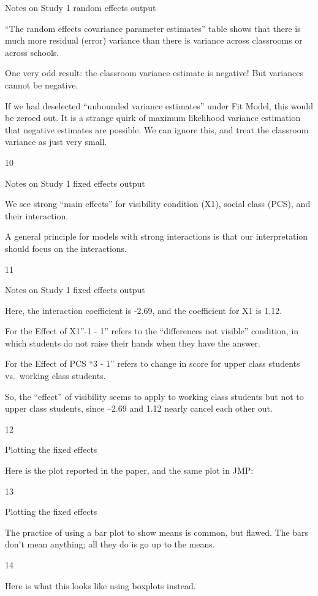 \documentclass[
  letterpaper,
  DIV=11,
  numbers=noendperiod]{scrreprt}
\begin{document}
Notes on Study 1 random effects output

``The random effects covariance parameter estimates'' table shows that
there is much more residual (error) variance than there is variance
across classrooms or across schools.

One very odd result: the classroom variance estimate is negative! But
variances cannot be negative.

If we had deselected ``unbounded variance estimates'' under Fit Model,
this would be zeroed out. It is a strange quirk of maximum likelihood
variance estimation that negative estimates are possible. We can ignore
this, and treat the classroom variance as just very small.

10

Notes on Study 1 fixed effects output

We see strong ``main effects'' for visibility condition (X1), social
class (PCS), and their interaction.

A general principle for models with strong interactions is that our
interpretation should focus on the interactions.

11

Notes on Study 1 fixed effects output

Here, the interaction coefficient is -2.69, and the coefficient for X1
is 1.12.

For the Effect of X1''-1 - 1'' refers to the ``differences not visible''
condition, in which students do not raise their hands when they have the
answer.

For the Effect of PCS ``3 - 1'' refers to change in score for upper
class students vs.~working class students.

So, the ``effect'' of visibility seems to apply to working class
students but not to upper class students, since --2.69 and 1.12 nearly
cancel each other out.

12

Plotting the fixed effects

Here is the plot reported in the paper, and the same plot in JMP:

13

Plotting the fixed effects

The practice of using a bar plot to show means is common, but flawed.
The bars don't mean anything; all they do is go up to the means.

14

Here is what this looks like using boxplots instead.
\end{document}
